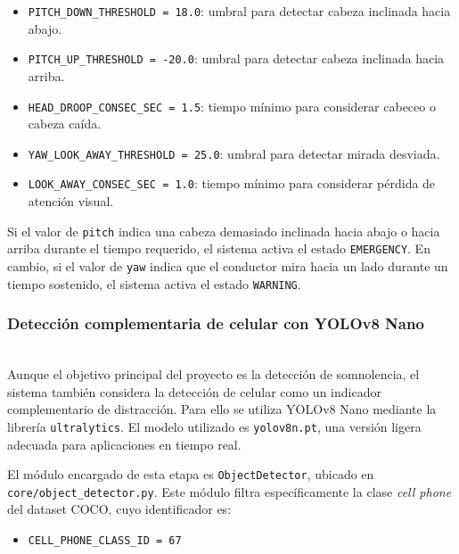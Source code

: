 \documentclass[conference]{IEEEtran}
\begin{document}
\begin{itemize}
    \item \texttt{PITCH\_DOWN\_THRESHOLD = 18.0}: umbral para detectar cabeza inclinada hacia abajo.
    
    \item \texttt{PITCH\_UP\_THRESHOLD = -20.0}: umbral para detectar cabeza inclinada hacia arriba.
    
    \item \texttt{HEAD\_DROOP\_CONSEC\_SEC = 1.5}: tiempo mínimo para considerar cabeceo o cabeza caída.
    
    \item \texttt{YAW\_LOOK\_AWAY\_THRESHOLD = 25.0}: umbral para detectar mirada desviada.
    
    \item \texttt{LOOK\_AWAY\_CONSEC\_SEC = 1.0}: tiempo mínimo para considerar pérdida de atención visual.
\end{itemize}

Si el valor de \texttt{pitch} indica una cabeza demasiado inclinada hacia abajo o hacia arriba durante el tiempo requerido, el sistema activa el estado \texttt{EMERGENCY}. En cambio, si el valor de \texttt{yaw} indica que el conductor mira hacia un lado durante un tiempo sostenido, el sistema activa el estado \texttt{WARNING}.\\

\subsubsection{Detección complementaria de celular con YOLOv8 Nano}\mbox{}\\

Aunque el objetivo principal del proyecto es la detección de somnolencia, el sistema también considera la detección de celular como un indicador complementario de distracción. Para ello se utiliza YOLOv8 Nano mediante la librería \texttt{ultralytics}. El modelo utilizado es \texttt{yolov8n.pt}, una versión ligera adecuada para aplicaciones en tiempo real.

El módulo encargado de esta etapa es \texttt{ObjectDetector}, ubicado en \texttt{core/object\_detector.py}. Este módulo filtra específicamente la clase \textit{cell phone} del dataset COCO, cuyo identificador es:

\begin{itemize}
    \item \texttt{CELL\_PHONE\_CLASS\_ID = 67}
\end{itemize}
\end{document}
